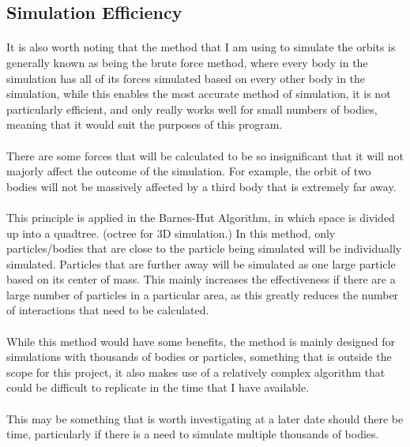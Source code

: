 \subsection{Simulation Efficiency}
\paragraph{}
It is also worth noting that the method that I am using to simulate the orbits is generally known as being the brute force method, where every body in the simulation has all of its forces simulated based on every other body in the simulation, while this enables the most accurate method of simulation, it is not particularly efficient, and only really works well for small numbers of bodies, meaning that it would suit the purposes of this program.

\paragraph{}
There are some forces that will be calculated to be so insignificant that it will not majorly affect the outcome of the simulation. For example, the orbit of two bodies will not be massively affected by a third body that is extremely far away. 

\paragraph{}
This principle is applied in the Barnes-Hut Algorithm, in which space is divided up into a quadtree. (octree for 3D simulation.) In this method, only particles/bodies that are close to the particle being simulated will be individually simulated. Particles that are further away will be simulated as one large particle based on its center of mass. This mainly increases the effectiveness if there are a large number of particles in a particular area, as this greatly reduces the number of interactions that need to be calculated.

\paragraph{}
While this method would have some benefits, the method is mainly designed for simulations with thousands of bodies or particles, something that is outside the scope for this project, it also makes use of a relatively complex algorithm that could be difficult to replicate in the time that I have available.

\paragraph{}
This may be something that is worth investigating at a later date should there be time, particularly if there is a need to simulate multiple thousands of bodies.

